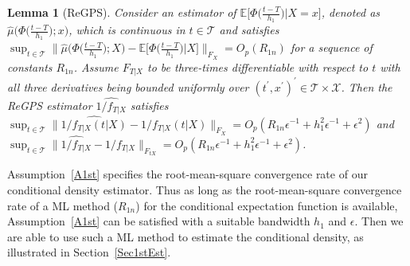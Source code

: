 \documentclass[lettersize, 12pt]{article}
\newtheorem{lemma}{Lemma}
\begin{document}
\begin{lemma}[ReGPS]
Consider an estimator of $\mathbb{E}\Big[\Phi\Big(\frac{t-T}{h_1}\Big)\Big|X=x\Big]$, denoted as $\hat \mu\Big(\Phi\Big(\frac{t-T}{h_1}\Big);x\Big)$, which is continuous in $t\in\mathcal{T}$ and satisfies $\sup_{t\in\mathcal{T}}
\Big\|\hat\mu\Big(\Phi\Big(\frac{t-T}{h_1}\Big); X\Big) - \mathbb{E}\Big[\Phi\Big(\frac{t-T}{h_1}\Big)\Big|X\Big]\Big\|_{F_X}
= O_p(R_{1n})$ for a sequence of constants $R_{1n}$.
Assume $F_{T|X}$ to be three-times differentiable with respect to $t$ with all three derivatives being bounded uniformly over $(t^\prime,x^\prime)^\prime\in\mathcal{T}\times\mathcal{X}$.
Then the ReGPS estimator $\widehat{1/f_{T|X}}$ satisfies 
$\sup_{t\in\mathcal{T}}\big\|\widehat{1/f_{T|X}(t|X)} - 1/f_{T|X}(t|X) \big\|_{F_X} = 
O_p(R_{1n}\epsilon^{-1} + h_1^2\epsilon^{-1} + \epsilon^2)$
and\ \
$\sup_{t\in\mathcal{T}}\big\| \widehat{1/f_{T|X}} - 1/f_{T|X} \big\|_{F_{tX}} = 
O_p(R_{1n}\epsilon^{-1} + h_1^2\epsilon^{-1} + \epsilon^2)$.
\label{LGPS}
\end{lemma}


Assumption~\ref{A1st} specifies the  root-mean-square convergence rate of our conditional density estimator. 
Thus as long as the root-mean-square convergence rate of a ML method  ($R_{1n}$) for the conditional expectation function is available, 
Assumption~\ref{A1st} can be satisfied with a suitable bandwidth $h_1$ and $\epsilon$.  
Then we are able to use such a ML method to estimate the conditional density, as illustrated in Section~\ref{Sec1stEst}.
\end{document}
